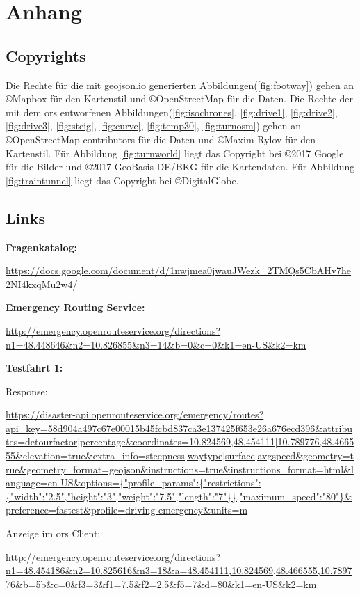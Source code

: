 \section{Anhang}
\label{sec:anhang}
\subsection*{Copyrights}
Die Rechte für die mit geojson.io generierten Abbildungen(\ref{fig:footway}) gehen an \copyright Mapbox für den Kartenstil und \copyright OpenStreetMap für die Daten.
Die Rechte der mit dem \gls{ors} entworfenen Abbildungen(\ref{fig:isochrones}, \ref{fig:drive1}, \ref{fig:drive2}, \ref{fig:drive3}, \ref{fig:steig}, \ref{fig:curve}, \ref{fig:temp30}, \ref{fig:turnosm}) gehen an \copyright OpenStreetMap contributors für die Daten und \copyright Maxim Rylov für den Kartenstil.
Für Abbildung \ref{fig:turnworld} liegt das Copyright bei \copyright 2017 Google für die Bilder und \copyright 2017 GeoBasis-DE/BKG für die Kartendaten.
Für Abbildung \ref{fig:traintunnel} liegt das Copyright bei \copyright DigitalGlobe.

\subsection*{Links}
\textbf{Fragenkatalog:}

\url{https://docs.google.com/document/d/1nwjmea0jwauJWezk_2TMQs5CbAHv7he2NI4kxqMu2w4/}
\medskip

\textbf{Emergency Routing Service:}

\url{http://emergency.openrouteservice.org/directions?n1=48.448646&n2=10.826855&n3=14&b=0&c=0&k1=en-US&k2=km}
\medskip

\textbf{Testfahrt 1:}

Response:\par
\url{https://disaster-api.openrouteservice.org/emergency/routes?api_key=58d904a497c67e00015b45fcbd837ca3e137425f653e26a676ecd396&attributes=detourfactor|percentage&coordinates=10.824569,48.454111|10.789776,48.466555&elevation=true&extra_info=steepness|waytype|surface|avgspeed&geometry=true&geometry_format=geojson&instructions=true&instructions_format=html&language=en-US&options={"profile_params":{"restrictions":{"width":"2.5","height":"3","weight":"7.5","length":"7"}},"maximum_speed":"80"}&preference=fastest&profile=driving-emergency&units=m}
\medskip

Anzeige im \gls{ors} Client:\par
\url{http://emergency.openrouteservice.org/directions?n1=48.454186&n2=10.825616&n3=18&a=48.454111,10.824569,48.466555,10.789776&b=5b&c=0&f3=3&f1=7.5&f2=2.5&f5=7&d=80&k1=en-US&k2=km}
\medskip


